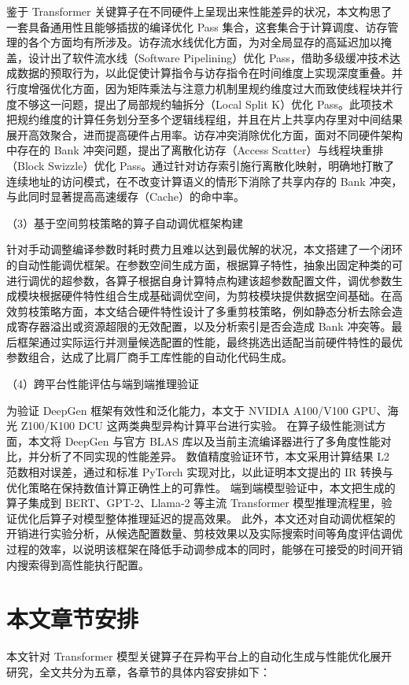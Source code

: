鉴于 Transformer 关键算子在不同硬件上呈现出来性能差异的状况，本文构思了一套具备通用性且能够插拔的编译优化 Pass 集合，这套集合于计算调度、访存管理的各个方面均有所涉及。访存流水线优化方面，为对全局显存的高延迟加以掩盖，设计出了软件流水线（Software Pipelining）优化 Pass，借助多级缓冲技术达成数据的预取行为，以此促使计算指令与访存指令在时间维度上实现深度重叠。并行度增强优化方面，因为矩阵乘法与注意力机制里规约维度过大而致使线程块并行度不够这一问题，提出了局部规约轴拆分（Local Split K）优化 Pass。此项技术把规约维度的计算任务划分至多个逻辑线程组，并且在片上共享内存里对中间结果展开高效聚合，进而提高硬件占用率。访存冲突消除优化方面，面对不同硬件架构中存在的 Bank 冲突问题，提出了离散化访存（Access Scatter）与线程块重排（Block Swizzle）优化 Pass。通过针对访存索引施行离散化映射，明确地打散了连续地址的访问模式，在不改变计算语义的情形下消除了共享内存的 Bank 冲突，与此同时显著提高高速缓存（Cache）的命中率。

（3）基于空间剪枝策略的算子自动调优框架构建

针对手动调整编译参数时耗时费力且难以达到最优解的状况，本文搭建了一个闭环的自动性能调优框架。在参数空间生成方面，根据算子特性，抽象出固定种类的可进行调优的超参数，各算子根据自身计算特点构建该超参数配置文件，调优参数生成模块根据硬件特性组合生成基础调优空间，为剪枝模块提供数据空间基础。在高效剪枝策略方面，本文结合硬件特性设计了多重剪枝策略，例如静态分析去除会造成寄存器溢出或资源超限的无效配置，以及分析索引是否会造成 Bank 冲突等。最后框架通过实际运行并测量候选配置的性能，最终挑选出适配当前硬件特性的最优参数组合，达成了比肩厂商手工库性能的自动化代码生成。

（4）跨平台性能评估与端到端推理验证

为验证 DeepGen 框架有效性和泛化能力，本文于 NVIDIA A100/V100 GPU、海光 Z100/K100 DCU 这两类典型异构计算平台进行实验。
在算子级性能测试方面，本文将 DeepGen 与官方 BLAS 库以及当前主流编译器进行了多角度性能对比，并分析了不同实现的性能差异。
数值精度验证环节，本文采用计算结果 L2 范数相对误差，通过和标准 PyTorch 实现对比，以此证明本文提出的 IR 转换与优化策略在保持数值计算正确性上的可靠性。
端到端模型验证中，本文把生成的算子集成到 BERT、GPT-2、Llama-2 等主流 Transformer 模型推理流程里，验证优化后算子对模型整体推理延迟的提高效果。
此外，本文还对自动调优框架的开销进行实验分析，从候选配置数量、剪枝效果以及实际搜索时间等角度评估调优过程的效率，以说明该框架在降低手动调参成本的同时，能够在可接受的时间开销内搜索得到高性能执行配置。


\section{本文章节安排}
本文针对 Transformer 模型关键算子在异构平台上的自动化生成与性能优化展开研究，全文共分为五章，各章节的具体内容安排如下：

